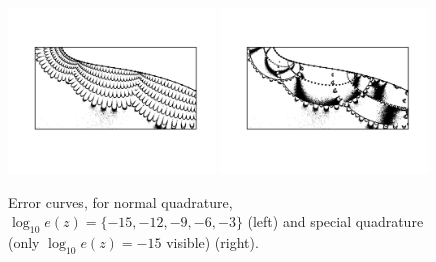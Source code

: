 \documentclass[a4paper,10pt]{article}
\begin{document}
\begin{figure}[ht]
    \begin{center}
        \includegraphics[width=0.49\textwidth]{Graphics/contour_panels35.png}
        \includegraphics[width =0.49\textwidth]{Graphics/contour_SQ_panels35.png}
    \end{center}
    \caption{Error curves, for normal quadrature, $\log_{10} e(z) = \{ -15,-12,-9,-6, -3 \}$ (left) and special quadrature (only $\log_{10} e(z) = -15$ visible) (right).}
    \label{fig:levelcurves}
\end{figure}
\FloatBarrier
\end{document}
